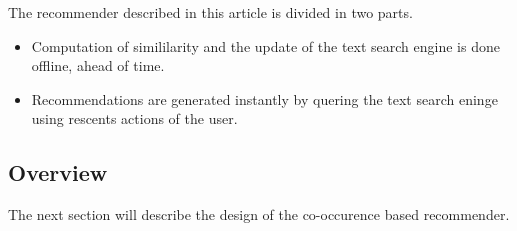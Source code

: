 The recommender described in this article is divided in two parts.
\begin{itemize}
\item Computation of simililarity and the update of the text search engine is done offline, ahead of time.
\item Recommendations are generated instantly by quering the text search eninge using rescents actions of the user.

\end{itemize}

\subsection{Overview}

The next section will describe the design of the co-occurence based recommender. 
